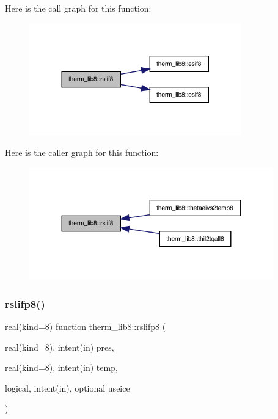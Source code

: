 Here is the call graph for this function\+:
\nopagebreak
\begin{figure}[H]
\begin{center}
\leavevmode
\includegraphics[width=260pt]{namespacetherm__lib8_a0f62e29f88493f7bc240060f337ade98_cgraph}
\end{center}
\end{figure}
Here is the caller graph for this function\+:
\nopagebreak
\begin{figure}[H]
\begin{center}
\leavevmode
\includegraphics[width=299pt]{namespacetherm__lib8_a0f62e29f88493f7bc240060f337ade98_icgraph}
\end{center}
\end{figure}
\mbox{\label{namespacetherm__lib8_ab015aacbfd2ec939e27197d7477f09a7}} 
\subsubsection{\texorpdfstring{rslifp8()}{rslifp8()}}
{\footnotesize\ttfamily real(kind=8) function therm\+\_\+lib8\+::rslifp8 (\begin{DoxyParamCaption}\item[{real(kind=8), intent(in)}]{pres,  }\item[{real(kind=8), intent(in)}]{temp,  }\item[{logical, intent(in), optional}]{useice }\end{DoxyParamCaption})}

